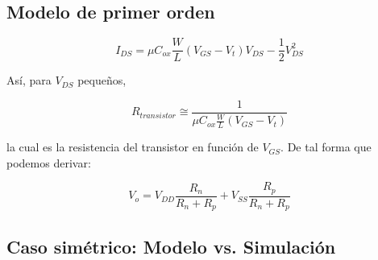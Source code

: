 \documentclass[
paper=128mm:96mm, %
fontsize=11pt, %
pagesize, %
parskip=half-, %
]{scrartcl} %
\newcommand*{\mygreen}[1]{\textcolor{mygreen}{#1}}
\theoremstyle{mythmstyle} %
\newtheorem{theorem}{Theorem}[section] %
\newtheorem{remark}[theorem]{Remark} %
\newtheorem{algorithm}[theorem]{Algorithm} %
\newcommand*{\mybox}[2]{ %
\par\noindent
\begin{tikzpicture}[mynodestyle/.style={rectangle,draw=mygreen,thick,inner sep=2mm,text justified,top color=white,bottom color=white,above}]\node[mynodestyle,at={(0.5*#1+2mm+0.4pt,0)}]{ %
\begin{minipage}[t]{#1}
#2
\end{minipage}
};
\end{tikzpicture}
\par\vspace{-1.3em}}
\begin{document}





\clearpage


\subsection{Modelo de primer orden}
\label{sec:model}

\begin{equation}
I_{DS}=\mu
C_{ox}\frac{W}{L}(V_{GS}-V_t)V_{DS}-\frac{1}{2}V_{DS}^2 \label{ec:lineal}
\end{equation}

\noindent Así, para $V_{DS}$ pequeños,

\begin{equation}
R_{transistor} \cong \frac{1}{\mu
  C_{ox}\frac{W}{L}(V_{GS}-V_t)} \label{ec:resistencia}
\end{equation}

\noindent la cual es la resistencia del transistor en funci\'on de
$V_{GS}$. De tal forma que podemos derivar:

\begin{equation}
V_o=V_{DD}\frac{R_n}{R_n+R_p}+V_{SS}\frac{R_p}{R_n+R_p} \label{ec:vout}
\end{equation}

\clearpage

\subsection{Caso simétrico: Modelo vs. Simulación}
\label{sec:simetrico}
\end{document}
